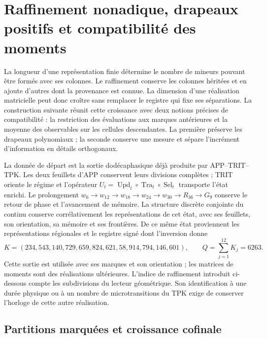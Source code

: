 \section{Raffinement nonadique, drapeaux positifs et compatibilité des moments}
\label{sec:dim-cofinal}

La longueur d'une représentation finie détermine le nombre de mineurs pouvant être formés avec ses colonnes. Le raffinement conserve les colonnes héritées et en ajoute d'autres dont la provenance est connue. La dimension d'une réalisation matricielle peut donc croître sans remplacer le registre qui fixe ses séparations. La construction suivante réunit cette croissance avec deux notions précises de compatibilité : la restriction des évaluations aux marques antérieures et la moyenne des observables sur les cellules descendantes. La première préserve les drapeaux polynomiaux ; la seconde conserve une mesure et sépare l'incrément d'information en détails orthogonaux.

La donnée de départ est la sortie dodécaphasique déjà produite par APP--TRIT--TPK. Les deux feuillets d'APP conservent leurs divisions complètes ; TRIT oriente le régime et l'opérateur \(U_t=\operatorname{Upd}_t\circ\operatorname{Tra}_t\circ
\operatorname{Sel}_t\) transporte l'état enrichi. Le prolongement \(w_6\to w_{12}\to w_{18}\to w_{24}\to w_{30}\to R_{36}\to G_9\) conserve le retour de phase et l'avancement de mémoire. La structure discrète conjointe du continu conserve corrélativement les représentations de cet état, avec ses feuillets, son orientation, sa mémoire et ses frontières. De ce même état proviennent les représentations régionales et le registre signé dont l'inversion donne
\[
 K=(234,543,140,729,659,824,621,58,914,794,146,601),
 \qquad Q=\sum_{j=1}^{12}K_j=6263.
\]
Cette sortie est utilisée avec ses marques et son orientation ; les matrices de
moments sont des réalisations ultérieures. L’indice de raffinement introduit
ci-dessous compte les subdivisions du lecteur géométrique. Son identification
à une durée physique ou à un nombre de microtransitions du TPK
exige de conserver l’horloge de cette autre réalisation.

\subsection{Partitions marquées et croissance cofinale}

